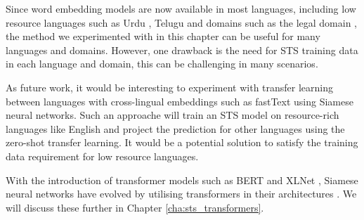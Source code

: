 Since word embedding models are now available in most languages, including low resource languages such as Urdu \autocite{haider-2018-urdu}, Telugu \autocite{kumar-etal-2020-passage} and domains such as the legal domain \autocite{Chalkidis2019}, the method we experimented with in this chapter can be useful for many languages and domains. However, one drawback is the need for STS training data in each language and domain, this can be challenging in many scenarios. 

As future work, it would be interesting to experiment with transfer learning between languages with cross-lingual embeddings such as fastText \autocite{mikolov-etal-2018-advances} using Siamese neural networks. Such an approache will train an STS model on resource-rich languages like English and project the prediction for other languages using the zero-shot transfer learning. It would be a potential solution to satisfy the training data requirement for low resource languages. 

With the introduction of transformer models such as BERT \autocite{devlin-etal-2019-bert} and XLNet \autocite{yang2019xlnet}, Siamese neural networks have evolved by utilising transformers in their architectures \autocite{reimers-gurevych-2019-sentence}. We will discuss these further in Chapter \ref{cha:sts_transformers}. 












